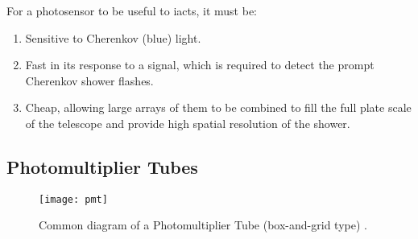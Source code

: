 For a photosensor to be useful to \glspl{iact}, it must be:
\begin{enumerate}
\item Sensitive to Cherenkov (blue) light.
\item Fast in its response to a signal, which is required to detect the prompt Cherenkov shower flashes.
\item Cheap, allowing large arrays of them to be combined to fill the full plate scale of the telescope and provide high spatial resolution of the shower.
\end{enumerate}

\subsection{Photomultiplier Tubes}

\begin{figure}
	\centering
    \texttt{[image: pmt]} 
	\caption[Diagram of a Photomultiplier Tube.]{Common diagram of a Photomultiplier Tube (box-and-grid type) \cite{Hamamatsu2016}.}
	\label{fig:pmt}
\end{figure}


